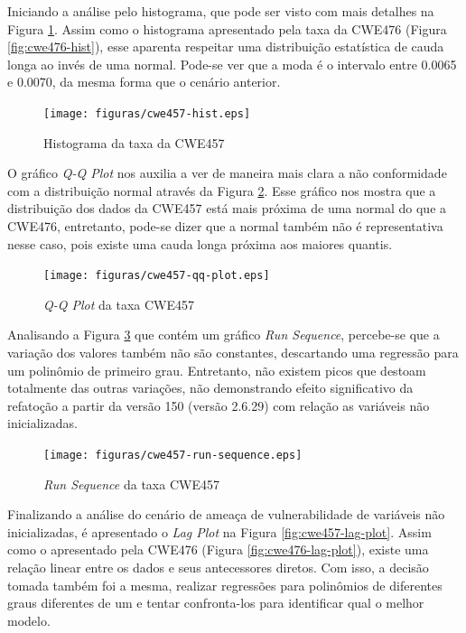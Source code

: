Iniciando a análise pelo histograma, que pode ser visto com mais detalhes na
Figura \ref{fig:cwe457-hist}. Assim como o histograma apresentado pela taxa da
CWE476 (Figura \ref{fig:cwe476-hist}), esse aparenta respeitar uma distribuição
estatística de cauda longa ao invés de uma normal. Pode-se ver que a moda é o
intervalo entre 0.0065 e 0.0070, da mesma forma que o cenário anterior.

\begin{figure}[h]
  \centering
  \texttt{[image: figuras/cwe457-hist.eps]}
      \caption{Histograma da taxa da CWE457}
  \label{fig:cwe457-hist}
\end{figure}

O gráfico \textit{Q-Q Plot} nos auxilia a ver de maneira mais clara a não
conformidade com a distribuição normal através da Figura
\ref{fig:cwe457-qq-plot}. Esse gráfico nos mostra que a distribuição dos dados
da CWE457 está mais próxima de uma normal do que a CWE476, entretanto, pode-se
dizer que a normal também não é representativa nesse caso, pois existe uma cauda
longa próxima aos maiores quantis.

\begin{figure}[h]
  \centering
  \texttt{[image: figuras/cwe457-qq-plot.eps]}
      \caption{\textit{Q-Q Plot} da taxa CWE457}
  \label{fig:cwe457-qq-plot}
\end{figure}

Analisando a Figura \ref{fig:cwe457-run-sequence} que contém um gráfico
\textit{Run Sequence}, percebe-se que a variação dos valores também não são
constantes, descartando uma regressão para um polinômio de primeiro grau.
Entretanto, não existem picos que destoam totalmente das outras variações, não
demonstrando efeito significativo da refatoção a partir da versão 150 (versão
2.6.29) com relação as variáveis não inicializadas.

\begin{figure}[h]
  \centering
  \texttt{[image: figuras/cwe457-run-sequence.eps]}
      \caption{\textit{Run Sequence} da taxa CWE457}
  \label{fig:cwe457-run-sequence}
\end{figure}

Finalizando a análise do cenário de ameaça de vulnerabilidade de variáveis não
inicializadas, é apresentado o \textit{Lag Plot} na Figura
\ref{fig:cwe457-lag-plot}. Assim como o apresentado pela CWE476 (Figura
\ref{fig:cwe476-lag-plot}), existe uma relação linear entre os dados e seus
antecessores diretos. Com isso, a decisão tomada também foi a mesma, realizar
regressões para polinômios de diferentes graus diferentes de um e tentar
confronta-los para identificar qual o melhor modelo.

